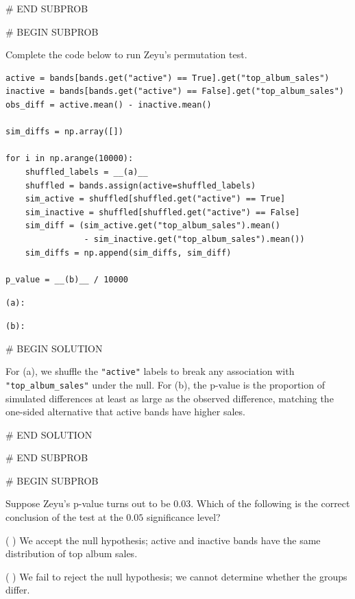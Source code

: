 \documentclass[twoside,12pt]{article}
\begin{document}
{# END SUBPROB

\bigskip

# BEGIN SUBPROB


Complete the code below to run Zeyu's permutation test.

\begin{Verbatim}
active = bands[bands.get("active") == True].get("top_album_sales")
inactive = bands[bands.get("active") == False].get("top_album_sales")
obs_diff = active.mean() - inactive.mean()

sim_diffs = np.array([])

for i in np.arange(10000):
    shuffled_labels = __(a)__
    shuffled = bands.assign(active=shuffled_labels)
    sim_active = shuffled[shuffled.get("active") == True]
    sim_inactive = shuffled[shuffled.get("active") == False]
    sim_diff = (sim_active.get("top_album_sales").mean()
                - sim_inactive.get("top_album_sales").mean())
    sim_diffs = np.append(sim_diffs, sim_diff)

p_value = __(b)__ / 10000
\end{Verbatim}

\smallskip
\texttt{(a):} 

\smallskip
\texttt{(b):} 

# BEGIN SOLUTION


For (a), we shuffle the \texttt{"active"} labels to break any association with \texttt{"top\_album\_sales"} under the null. For (b), the p-value is the proportion of simulated differences at least as large as the observed difference, matching the one-sided alternative that active bands have higher sales.


# END SOLUTION



# END SUBPROB

\newpage

# BEGIN SUBPROB


Suppose Zeyu's p-value turns out to be $0.03$. Which of the following is the correct conclusion of the test at the $0.05$ significance level?

\smallskip
( ) We accept the null hypothesis; active and inactive bands have the same distribution \gap of top album sales.

\smallskip
( ) We fail to reject the null hypothesis; we cannot determine whether the groups \gap differ.

}
\end{document}
